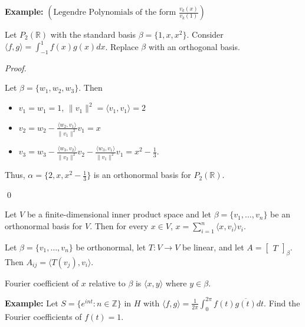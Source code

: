 \documentclass[12pt]{article}
\newenvironment{theorem}[2][Theorem]{\begin{trivlist}
\item[\hskip \labelsep {\bfseries #1}\hskip \labelsep {\bfseries #2.}]}{\end{trivlist}}
\newenvironment{corollary}[2][Corollary]{\begin{trivlist}
\item[\hskip \labelsep {\bfseries #1}\hskip \labelsep {\bfseries #2}]}{\end{trivlist}}
\newenvironment{sol}
    {\emph{Proof.}
    }
    {
    \qed
    }
\begin{document}
\vspace{1em}

\noindent\textbf{Example:} $\left(\text{Legendre Polynomials of the form } \frac{v_k(x)}{v_k(1)}\right)$

Let $P_2(\mathbb{R})$ with the standard basis $\beta = \{1, x, x^2\}$. Consider $\langle f, g \rangle = \int_{-1}^1 f(x)g(x)dx$. Replace $\beta$ with an orthogonal basis.

\begin{sol}
Let $\beta = \{w_1, w_2, w_3\}$. Then \begin{itemize}
    \item $v_1 = w_1 = 1$, $\lVert v_1 \rVert^2 = \langle v_1, v_1 \rangle = 2$
    
    \item $v_2 = w_2 - \frac{\langle w_2, v_1 \rangle}{\lVert v_1 \rVert^2}v_1 = x$
    
    \item $v_3 = w_3 - \frac{\langle w_3, v_2 \rangle}{\lVert v_2 \rVert^2}v_2 - \frac{\langle w_3, v_1 \rangle}{\lVert v_1 \rVert^2}v_1 = x^2 - \frac{1}{3}$.
\end{itemize}
Thus, $\alpha = \{2, x, x^2 - \frac{1}{3}\}$ is an orthonormal basis for $P_2(\mathbb{R})$.
\end{sol}

\begin{theorem}{6.5}
Let $V$ be a finite-dimensional inner product space and let $\beta = \{v_1, \dots, v_n\}$ be an orthonormal basis for $V$. Then for every $x \in V$, $x = \sum_{i = 1}^n \langle x, v_i \rangle v_i$.
\end{theorem}

\begin{corollary}{7}
Let $\beta = \{v_1, \dots, v_n\}$ be orthonormal, let $T : V \to V$ be linear, and let $A = \begin{bmatrix}
T
\end{bmatrix}_\beta$. Then $A_{ij} = \langle T(v_j), v_i \rangle$. 
\end{corollary}

\noindent Fourier coefficient of $x$ relative to $\beta$ is $\langle x, y \rangle$ where $y \in \beta$.

\vspace{1em}

\noindent\textbf{Example:} Let $S = \{e^{int} : n \in \mathbb{Z}\}$ in $H$ with $\langle f, g \rangle = \frac{1}{2\pi} \int_0^{2\pi} f(t) \overline{g(t)}dt$. Find the Fourier coefficients of $f(t) = 1$. 
\end{document}
